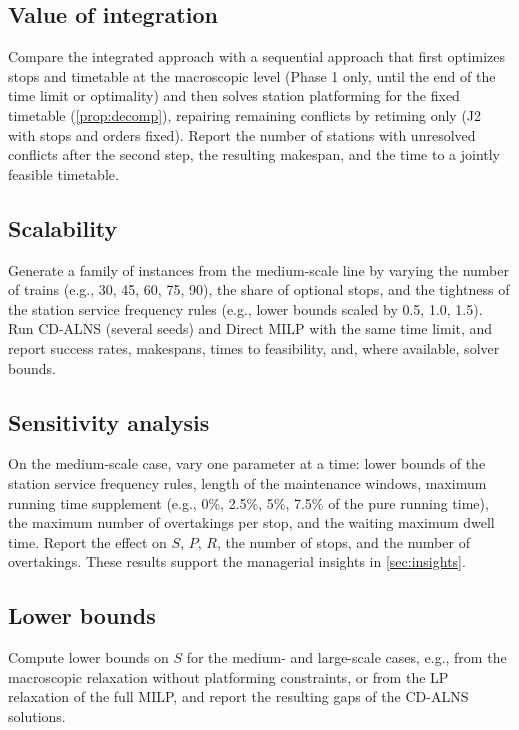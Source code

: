 \subsection{Value of integration}\label{sec:sequential}
\begin{pending}
Compare the integrated approach with a sequential approach that first optimizes stops and timetable at the macroscopic level (Phase 1 only, until the end of the time limit or optimality) and then solves station platforming for the fixed timetable (\cref{prop:decomp}), repairing remaining conflicts by retiming only (J2 with stops and orders fixed). Report the number of stations with unresolved conflicts after the second step, the resulting makespan, and the time to a jointly feasible timetable.
\end{pending}

\subsection{Scalability}\label{sec:scalability}
\begin{pending}
Generate a family of instances from the medium-scale line by varying the number of trains (e.g., 30, 45, 60, 75, 90), the share of optional stops, and the tightness of the station service frequency rules (e.g., lower bounds scaled by 0.5, 1.0, 1.5). Run CD-ALNS (several seeds) and Direct MILP with the same time limit, and report success rates, makespans, times to feasibility, and, where available, solver bounds.
\end{pending}

\subsection{Sensitivity analysis}\label{sec:sensitivity}
\begin{pending}
On the medium-scale case, vary one parameter at a time: lower bounds of the station service frequency rules, length of the maintenance windows, maximum running time supplement (e.g., 0\%, 2.5\%, 5\%, 7.5\% of the pure running time), the maximum number of overtakings per stop, and the waiting maximum dwell time. Report the effect on $S$, $P$, $R$, the number of stops, and the number of overtakings. These results support the managerial insights in \cref{sec:insights}.
\end{pending}

\subsection{Lower bounds}\label{sec:bounds}
\begin{pending}
Compute lower bounds on $S$ for the medium- and large-scale cases, e.g., from the macroscopic relaxation without platforming constraints, or from the LP relaxation of the full MILP, and report the resulting gaps of the CD-ALNS solutions.
\end{pending}
